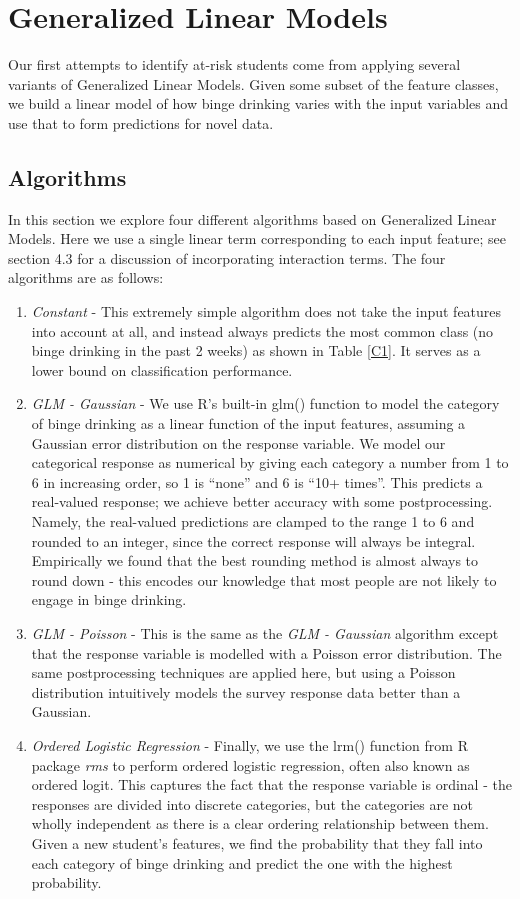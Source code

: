 \section{Generalized Linear Models}
\label{sec:linear}

Our first attempts to identify at-risk students come from applying several variants of Generalized Linear Models.  Given some subset of the feature classes, we build a linear model of how binge drinking varies with the input variables and use that to form predictions for novel data.

\subsection{Algorithms}

In this section we explore four different algorithms based on Generalized Linear Models.  Here we use a single linear term corresponding to each input feature; see section 4.3 for a discussion of incorporating interaction terms.  The four algorithms are as follows:

\begin{enumerate}
\item \emph{Constant} - This extremely simple algorithm does not take the input features into account at all, and instead always predicts the most common class (no binge drinking in the past 2 weeks) as shown in Table \ref{C1}.  It serves as a lower bound on classification performance.
\item \emph{GLM - Gaussian} - We use R's built-in glm() function \cite{glm} to model the category of binge drinking as a linear function of the input features, assuming a Gaussian error distribution on the response variable.  We model our categorical response as numerical by giving each category a number from 1 to 6 in increasing order, so 1 is ``none'' and 6 is ``10+ times''.  This predicts a real-valued response; we achieve better accuracy with some postprocessing.  Namely, the real-valued predictions are clamped to the range 1 to 6 and rounded to an integer, since the correct response will always be integral.  Empirically we found that the best rounding method is almost always to round down - this encodes our knowledge that most people are not likely to engage in binge drinking.
\item \emph{GLM - Poisson} - This is the same as the \emph{GLM - Gaussian} algorithm except that the response variable is modelled with a Poisson error distribution.  The same postprocessing techniques are applied here, but using a Poisson distribution intuitively models the survey response data better than a Gaussian.
\item \emph{Ordered Logistic Regression} - Finally, we use the lrm() function from R package \emph{rms} \cite{lrm} to perform ordered logistic regression, often also known as ordered logit.  This captures the fact that the response variable is ordinal - the responses are divided into discrete categories, but the categories are not wholly independent as there is a clear ordering relationship between them.  Given a new student's features, we find the probability that they fall into each category of binge drinking and predict the one with the highest probability.
\end{enumerate}

